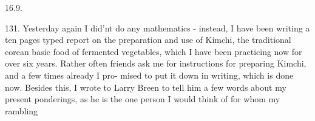 16.9.

131. Yesterday again I did'nt do any mathematics - instead, I have
been writing a ten pages typed report on the preparation and use of
Kimchi, the traditional corean basic food of fermented vegetables, which
I have been practicing now for over six years. Rather often friends ask
me for instructions for preparing Kimchi, and a few times already I pro-%
mised to put it down in writing, which is done now. Besides this, I
wrote to Larry Breen to tell him a few words about my present ponderings,
as he is the one person I would think of for whom my  rambling

